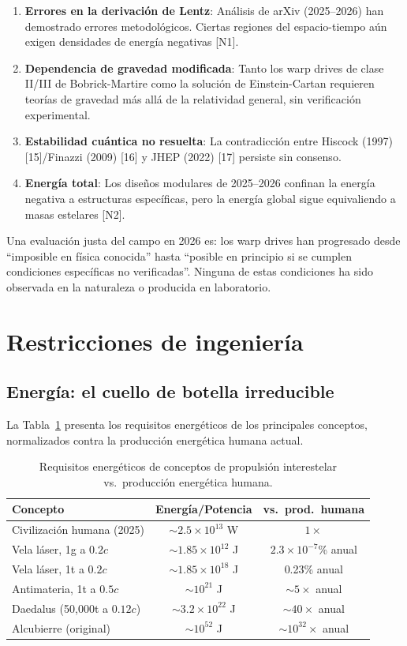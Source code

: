 \documentclass[11pt,a4paper,onecolumn]{article}
\begin{document}
\begin{enumerate}
  \item \textbf{Errores en la derivación de Lentz}: Análisis de arXiv (2025--2026) han demostrado errores metodológicos. Ciertas regiones del espacio-tiempo aún exigen densidades de energía negativas [N1].
  \item \textbf{Dependencia de gravedad modificada}: Tanto los warp drives de clase II/III de Bobrick-Martire como la solución de Einstein-Cartan requieren teorías de gravedad más allá de la relatividad general, sin verificación experimental.
  \item \textbf{Estabilidad cuántica no resuelta}: La contradicción entre Hiscock (1997) [15]/Finazzi (2009) [16] y JHEP (2022) [17] persiste sin consenso.
  \item \textbf{Energía total}: Los diseños modulares de 2025--2026 confinan la energía negativa a estructuras específicas, pero la energía global sigue equivaliendo a masas estelares [N2].
\end{enumerate}

Una evaluación justa del campo en 2026 es: los warp drives han progresado desde ``imposible en física conocida'' hasta ``posible en principio si se cumplen condiciones específicas no verificadas''. Ninguna de estas condiciones ha sido observada en la naturaleza o producida en laboratorio.

\section{Restricciones de ingeniería}

\subsection{Energía: el cuello de botella irreducible}

La Tabla~\ref{tab:energia} presenta los requisitos energéticos de los principales conceptos, normalizados contra la producción energética humana actual.

\begin{table}[h]
\centering
\caption{Requisitos energéticos de conceptos de propulsión interestelar vs.\ producción energética humana.}
\label{tab:energia}
\begin{tabular}{lcc}
\hline
\textbf{Concepto} & \textbf{Energía/Potencia} & \textbf{vs.\ prod.\ humana} \\
\hline
Civilización humana (2025) & $\sim2.5\times10^{13}$ W & $1\times$ \\
Vela láser, 1g a $0.2c$ & $\sim1.85\times10^{12}$ J & $2.3\times10^{-7}$\% anual \\
Vela láser, 1t a $0.2c$ & $\sim1.85\times10^{18}$ J & 0.23\% anual \\
Antimateria, 1t a $0.5c$ & $\sim10^{21}$ J & $\sim5\times$ anual \\
Daedalus (50,000t a $0.12c$) & $\sim3.2\times10^{22}$ J & $\sim40\times$ anual \\
Alcubierre (original) & $\sim10^{52}$ J & $\sim10^{32}\times$ anual \\
\hline
\end{tabular}
\end{table}
\end{document}
